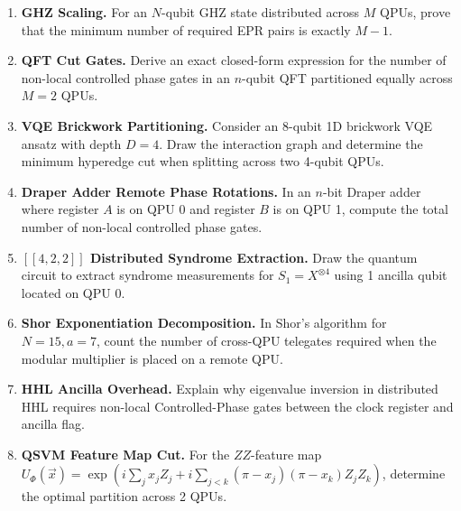\begin{enumerate}[label=\textbf{10.\arabic*.}]
    \item \textbf{GHZ Scaling.} For an $N$-qubit GHZ state distributed across $M$ QPUs, prove that the minimum number of required EPR pairs is exactly $M - 1$.
    \item \textbf{QFT Cut Gates.} Derive an exact closed-form expression for the number of non-local controlled phase gates in an $n$-qubit QFT partitioned equally across $M = 2$ QPUs.
    \item \textbf{VQE Brickwork Partitioning.} Consider an 8-qubit 1D brickwork VQE ansatz with depth $D = 4$. Draw the interaction graph and determine the minimum hyperedge cut when splitting across two 4-qubit QPUs.
    \item \textbf{Draper Adder Remote Phase Rotations.} In an $n$-bit Draper adder where register $A$ is on QPU 0 and register $B$ is on QPU 1, compute the total number of non-local controlled phase gates.
    \item \textbf{$[[4, 2, 2]]$ Distributed Syndrome Extraction.} Draw the quantum circuit to extract syndrome measurements for $S_1 = X^{\otimes 4}$ using 1 ancilla qubit located on QPU 0.
    \item \textbf{Shor Exponentiation Decomposition.} In Shor's algorithm for $N = 15, a = 7$, count the number of cross-QPU telegates required when the modular multiplier is placed on a remote QPU.
    \item \textbf{HHL Ancilla Overhead.} Explain why eigenvalue inversion in distributed HHL requires non-local Controlled-Phase gates between the clock register and ancilla flag.
    \item \textbf{QSVM Feature Map Cut.} For the $ZZ$-feature map $U_\Phi(\vec{x}) = \exp(i \sum_j x_j Z_j + i \sum_{j < k} (\pi - x_j)(\pi - x_k) Z_j Z_k)$, determine the optimal partition across 2 QPUs.
\end{enumerate}
